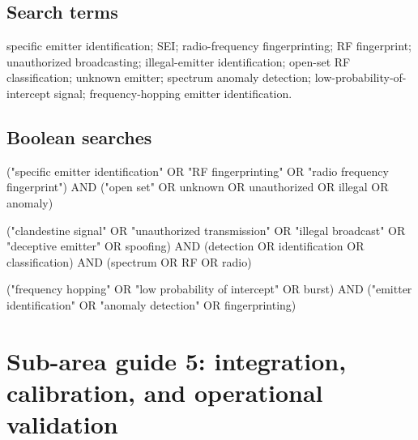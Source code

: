 \documentclass[
  10pt,
]{article}
\newenvironment{Shaded}{}{}
\newcommand{\NormalTok}[1]{#1}
\begin{document}
\subsection{Search terms}\label{search-terms-3}

specific emitter identification; SEI; radio-frequency fingerprinting; RF
fingerprint; unauthorized broadcasting; illegal-emitter identification;
open-set RF classification; unknown emitter; spectrum anomaly detection;
low-probability-of-intercept signal; frequency-hopping emitter
identification.

\subsection{Boolean searches}\label{boolean-searches-3}

\begin{Shaded}
\begin{Highlighting}[]
\NormalTok{("specific emitter identification" OR "RF fingerprinting" OR "radio frequency fingerprint")}
\NormalTok{AND ("open set" OR unknown OR unauthorized OR illegal OR anomaly)}
\end{Highlighting}
\end{Shaded}

\begin{Shaded}
\begin{Highlighting}[]
\NormalTok{("clandestine signal" OR "unauthorized transmission" OR "illegal broadcast"}
\NormalTok{ OR "deceptive emitter" OR spoofing)}
\NormalTok{AND (detection OR identification OR classification)}
\NormalTok{AND (spectrum OR RF OR radio)}
\end{Highlighting}
\end{Shaded}

\begin{Shaded}
\begin{Highlighting}[]
\NormalTok{("frequency hopping" OR "low probability of intercept" OR burst)}
\NormalTok{AND ("emitter identification" OR "anomaly detection" OR fingerprinting)}
\end{Highlighting}
\end{Shaded}

\section{Sub-area guide 5: integration, calibration, and operational
validation}\label{sub-area-guide-5-integration-calibration-and-operational-validation}
\end{document}
